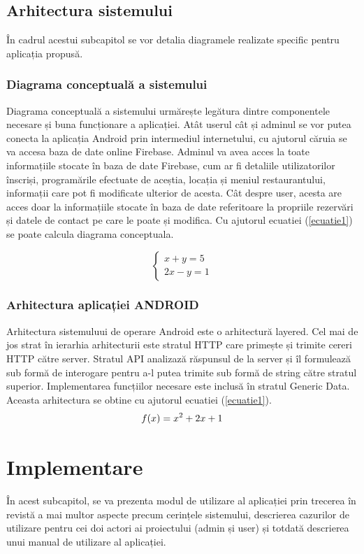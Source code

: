 \documentclass[a4paper,12pt]{book}
\begin{document}
\subsection{Arhitectura sistemului}
În cadrul acestui subcapitol se vor detalia diagramele realizate specific pentru aplicația propusă.
\subsubsection{Diagrama conceptuală a sistemului}
Diagrama conceptuală a sistemului urmărește legătura dintre componentele 
necesare și buna funcționare a aplicației. Atât userul cât și adminul se vor putea 
conecta la aplicația Android prin intermediul internetului, cu ajutorul căruia se va accesa 
baza de date online Firebase.\cite{aplication}
Adminul va avea acces la toate informațiile stocate în baza de date Firebase, cum ar 
fi detaliile utilizatorilor înscriși, programările efectuate de aceștia, locația și meniul 
restaurantului, informații care pot fi modificate ulterior de acesta.
Cât despre user, acesta are acces doar la informațiile stocate în baza de date 
referitoare la propriile rezervări și datele de contact pe care le poate și modifica. Cu ajutorul ecuatiei (\ref{ecuatie1}) se poate calcula diagrama conceptuala.

\begin{equation}
  \begin{cases}
    x + y = 5 \\
    2x - y = 1
  \end{cases}
  \label{ecuatie1}
\end{equation}
\subsubsection{Arhitectura aplicației ANDROID}
Arhitectura sistemuluui de operare Android este o arhitectură layered. 
Cel mai de jos strat în ierarhia arhitecturii este stratul HTTP care primește și 
trimite cereri HTTP către server. Stratul API analizază răspunsul de la server și îl 
formulează sub formă de interogare pentru a-l putea trimite sub formă de string către 
stratul superior. Implementarea funcțiilor necesare este inclusă în stratul Generic Data. 
Aceasta arhitectura se obtine cu ajutorul ecuatiei (\ref{ecuatie1}).
\begin{equation}
    \centering
  \label{ecuatie2}
  f(x) = x^2 + 2x + 1
\end{equation}
\section{Implementare}
În acest subcapitol, se va prezenta modul de utilizare al aplicației prin trecerea în revistă a mai multor aspecte precum cerințele sistemului, descrierea cazurilor de utilizare pentru cei doi actori ai proiectului (admin și user) și totdată descrierea unui manual de utilizare al aplicației.
\end{document}
